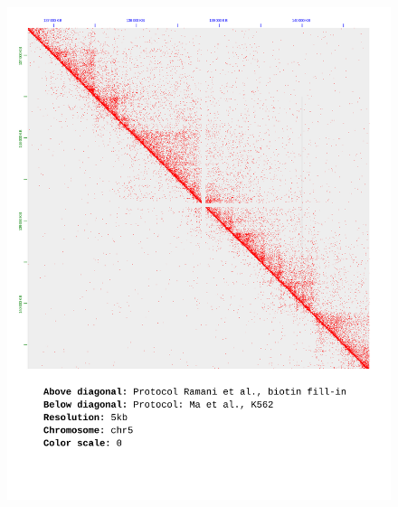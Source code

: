 \documentclass[a4paper,14pt]{extarticle}
\begin{document}
\begin{figure}[hp!] \includegraphics[width=1\textwidth]{s5_s30_chr5_5kb_0.pdf} \end{figure}
\end{document}

